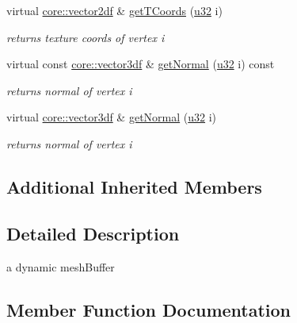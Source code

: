 \begin{DoxyCompactItemize}
virtual \hyperlink{namespaceirr_1_1core_a116f90bd31515724b6235014ee2b74d5}{core\+::vector2df} \& \hyperlink{classirr_1_1scene_1_1IDynamicMeshBuffer_aa366aaa5bc8488af18a3814a30cb7f09}{get\+T\+Coords} (\hyperlink{namespaceirr_a0416a53257075833e7002efd0a18e804}{u32} i)
\begin{DoxyCompactList}\small\item\em returns texture coords of vertex i \end{DoxyCompactList}\item 
\mbox{\label{classirr_1_1scene_1_1IDynamicMeshBuffer_af4f8cbcaef9632e5b68b14d15d068218}} 
virtual const \hyperlink{namespaceirr_1_1core_ae6e2b2a6c552833ebbd5b7463d03586b}{core\+::vector3df} \& \hyperlink{classirr_1_1scene_1_1IDynamicMeshBuffer_af4f8cbcaef9632e5b68b14d15d068218}{get\+Normal} (\hyperlink{namespaceirr_a0416a53257075833e7002efd0a18e804}{u32} i) const
\begin{DoxyCompactList}\small\item\em returns normal of vertex i \end{DoxyCompactList}\item 
\mbox{\label{classirr_1_1scene_1_1IDynamicMeshBuffer_a8a1647d10585b9cd262feeeac98ae371}} 
virtual \hyperlink{namespaceirr_1_1core_ae6e2b2a6c552833ebbd5b7463d03586b}{core\+::vector3df} \& \hyperlink{classirr_1_1scene_1_1IDynamicMeshBuffer_a8a1647d10585b9cd262feeeac98ae371}{get\+Normal} (\hyperlink{namespaceirr_a0416a53257075833e7002efd0a18e804}{u32} i)
\begin{DoxyCompactList}\small\item\em returns normal of vertex i \end{DoxyCompactList}\end{DoxyCompactItemize}
\subsection*{Additional Inherited Members}


\subsection{Detailed Description}
a dynamic mesh\+Buffer 

\subsection{Member Function Documentation}
\mbox{\label{classirr_1_1scene_1_1IDynamicMeshBuffer_a0fb73ead4f2d2d86e9fef8768be1a1ff}} 
